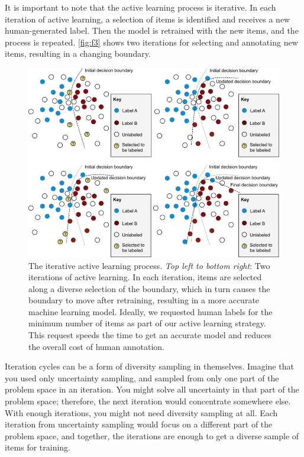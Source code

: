 \documentclass[sigconf,nonacm,screen,pbalance]{acmart}
\begin{document}
It
is important to note that the active learning process is iterative. In each iteration of
active learning, a selection of items is identified and receives a new human-generated
label. Then the model is retrained with the new items, and the process is repeated.
\autoref{fig:f3} shows two iterations for selecting and annotating new items, resulting in a
changing boundary.

\begin{figure}[ht]
\centering
\includegraphics[width=\columnwidth]{CH01_F03_Munro.png}
\vspace{-20pt}
\caption{The iterative active learning process. \emph{Top left to bottom right}: Two
iterations of active learning. In each iteration, items are selected along a diverse
selection of the boundary, which in turn causes the boundary to move after retraining,
resulting in a more accurate machine learning model. Ideally, we requested human labels
for the minimum number of items as part of our active learning strategy. This request
speeds the time to get an accurate model and reduces the overall cost of human
annotation.}
\vspace{-20pt}
\label{fig:f3}
\end{figure}

Iteration
cycles can be a form of diversity sampling in themselves. Imagine that you used only
uncertainty sampling, and sampled from only one part of the problem space in an
iteration. You might solve all uncertainty in that part of the problem space; therefore,
the next iteration would concentrate somewhere else. With enough iterations, you might
not need diversity sampling at all. Each iteration from uncertainty sampling would focus
on a different part of the problem space, and together, the iterations are enough to get
a diverse sample of items for training.
\end{document}
